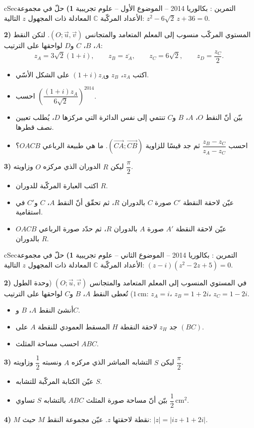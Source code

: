 \documentclass[12pt,a4paper]{article}
\newenvironment{BOX}[2]{\begin{otherlanguage}{english}\begin{arbox}{#1}{#2}}{\end{arbox}\end{otherlanguage}}
\newcounter{exo}
\newenvironment{tamrin}[1]{\stepcounter{exo}\begin{BOX}{cSec}{التمرين \theexo: #1}}{\end{BOX}}
\newenvironment{sq}{\begin{itemize}[leftmargin=2.4em,itemsep=3pt]}{\end{itemize}}
\newcommand{\qa}{\item[(أ)]}\newcommand{\qb}{\item[(ب)]}\newcommand{\qc}{\item[(جـ)]}\newcommand{\qd}{\item[(د)]}\newcommand{\qe}{\item[(هـ)]}
\begin{document}
\begin{tamrin}{بكالوريا 2014 -- الموضوع الأول -- علوم تجريبية}
\textbf{1)} حلّ في مجموعة الأعداد المركّبة $\mathbb{C}$ المعادلة ذات المجهول $z$ التالية: $z^2-6\sqrt2\,z+36=0$.

\textbf{2)} المستوي المركّب منسوب إلى المعلم المتعامد والمتجانس $(O;\vec u,\vec v)$. لتكن النقط $A$، $B$، $C$ و$D$ لواحقها على الترتيب:
\[z_A=3\sqrt2(1+i),\qquad z_B=\overline{z_A},\qquad z_C=6\sqrt2,\qquad z_D=\frac{z_C}{2}.\]
\begin{sq}
\qa اكتب $z_A$، $z_B$ و$(1+i)z_A$ على الشكل الأسّي.
\qb احسب $\left(\dfrac{(1+i)z_A}{6\sqrt2}\right)^{2014}$.
\qc بيّن أنّ النقط $O$، $A$، $B$ و$C$ تنتمي إلى نفس الدائرة التي مركزها $D$، يُطلب تعيين نصف قطرها.
\qd احسب $\dfrac{z_B-z_C}{z_A-z_C}$ ثم جد قيسًا للزاوية $(\overrightarrow{CA};\overrightarrow{CB})$. ما هي طبيعة الرباعي $OACB$؟
\end{sq}
\textbf{3)} ليكن $R$ الدوران الذي مركزه $O$ وزاويته $\dfrac{\pi}{2}$.
\begin{sq}
\qa اكتب العبارة المركّبة للدوران $R$.
\qb عيّن لاحقة النقطة $C'$ صورة $C$ بالدوران $R$، ثم تحقّق أنّ النقط $A$، $C$ و$C'$ في استقامية.
\qc عيّن لاحقة النقطة $A'$ صورة $A$ بالدوران $R$، ثم حدّد صورة الرباعي $OACB$ بالدوران $R$.
\end{sq}
\end{tamrin}

\begin{tamrin}{بكالوريا 2014 -- الموضوع الثاني -- علوم تجريبية}
\textbf{1)} حلّ في مجموعة الأعداد المركّبة $\mathbb{C}$ المعادلة ذات المجهول $z$ التالية: $(z-i)(z^2-2z+5)=0$.

\textbf{2)} في المستوي المنسوب إلى المعلم المتعامد والمتجانس $(O;\vec u,\vec v)$ (وحدة الطول $1\,\mathrm{cm}$) تُعطى النقط $A$، $B$ و$C$ لواحقها على الترتيب: $z_A=i$، $z_B=1+2i$، $z_C=1-2i$.
\begin{sq}
\qa أنشئ النقط $A$، $B$ و$C$.
\qb جد $z_H$ لاحقة النقطة $H$ المسقط العمودي للنقطة $A$ على $(BC)$.
\qc احسب مساحة المثلث $ABC$.
\end{sq}
\textbf{3)} ليكن $S$ التشابه المباشر الذي مركزه $A$ ونسبته $\dfrac12$ وزاويته $\dfrac{\pi}{2}$.
\begin{sq}
\qa عيّن الكتابة المركّبة للتشابه $S$.
\qb بيّن أنّ مساحة صورة المثلث $ABC$ بالتشابه $S$ تساوي $\dfrac12\,\mathrm{cm}^2$.
\end{sq}
\textbf{4)} $M$ نقطة لاحقتها $z$. عيّن مجموعة النقط $M$ حيث: $|z|=|iz+1+2i|$.
\end{tamrin}
\end{document}
